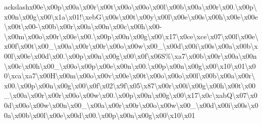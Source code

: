 ackslash{}x00e\textbackslash{}x00p\textbackslash{}x00a\textbackslash{}x00r\textbackslash{}x00t\textbackslash{}x00o\textbackslash{}x00o\textbackslash{}x00l\textbackslash{}x00b\textbackslash{}x00a\textbackslash{}x00r\textbackslash{}x00.\textbackslash{}x00p\textbackslash{}x00n\textbackslash{}x00g\textbackslash{}x00\textbackslash{}x1a\textbackslash{}x01!\textbackslash{}xeb\+G\textbackslash{}x00s\textbackslash{}x00t\textbackslash{}x00y\textbackslash{}x00l\textbackslash{}x00e\textbackslash{}x00s\textbackslash{}x00h\textbackslash{}x00e\textbackslash{}x00e\textbackslash{}x00t\textbackslash{}x00-\/\textbackslash{}x00b\textbackslash{}x00r\textbackslash{}x00a\textbackslash{}x00n\textbackslash{}x00c\textbackslash{}x00h\textbackslash{}x00-\/\textbackslash{}x00m\textbackslash{}x00o\textbackslash{}x00r\textbackslash{}x00e\textbackslash{}x00.\textbackslash{}x00p\textbackslash{}x00n\textbackslash{}x00g\textbackslash{}x00\textbackslash{}x17\textbackslash{}x0ce\textbackslash{}xce\textbackslash{}x07\textbackslash{}x00l\textbackslash{}x00e\textbackslash{}x00f\textbackslash{}x00t\textbackslash{}x00\+\_\+\textbackslash{}x00a\textbackslash{}x00r\textbackslash{}x00r\textbackslash{}x00o\textbackslash{}x00w\textbackslash{}x00\+\_\+\textbackslash{}x00d\textbackslash{}x00i\textbackslash{}x00s\textbackslash{}x00a\textbackslash{}x00b\textbackslash{}x00l\textbackslash{}x00e\textbackslash{}x00d\textbackslash{}x00.\textbackslash{}x00p\textbackslash{}x00n\textbackslash{}x00g\textbackslash{}x00\textbackslash{}x0f\textbackslash{}x06\+S\%\textbackslash{}xa7\textbackslash{}x00b\textbackslash{}x00r\textbackslash{}x00a\textbackslash{}x00n\textbackslash{}x00c\textbackslash{}x00h\textbackslash{}x00\+\_\+\textbackslash{}x00o\textbackslash{}x00p\textbackslash{}x00e\textbackslash{}x00n\textbackslash{}x00.\textbackslash{}x00p\textbackslash{}x00n\textbackslash{}x00g\textbackslash{}x00\textbackslash{}x10\textbackslash{}x01\textbackslash{}x00\textbackslash{}xca\textbackslash{}xa7\textbackslash{}x00\+H\textbackslash{}x00m\textbackslash{}x00o\textbackslash{}x00v\textbackslash{}x00e\textbackslash{}x00t\textbackslash{}x00o\textbackslash{}x00o\textbackslash{}x00l\textbackslash{}x00b\textbackslash{}x00a\textbackslash{}x00r\textbackslash{}x00.\textbackslash{}x00p\textbackslash{}x00n\textbackslash{}x00g\textbackslash{}x00\textbackslash{}x0f\textbackslash{}x02\textbackslash{}x9f\textbackslash{}x05\textbackslash{}x87\textbackslash{}x00r\textbackslash{}x00i\textbackslash{}x00g\textbackslash{}x00h\textbackslash{}x00t\textbackslash{}x00\+\_\+\textbackslash{}x00a\textbackslash{}x00r\textbackslash{}x00r\textbackslash{}x00o\textbackslash{}x00w\textbackslash{}x00.\textbackslash{}x00p\textbackslash{}x00n\textbackslash{}x00g\textbackslash{}x00\textbackslash{}x17\textbackslash{}x0c\textbackslash{}xab\+Q\textbackslash{}x07\textbackslash{}x00d\textbackslash{}x00o\textbackslash{}x00w\textbackslash{}x00n\textbackslash{}x00\+\_\+\textbackslash{}x00a\textbackslash{}x00r\textbackslash{}x00r\textbackslash{}x00o\textbackslash{}x00w\textbackslash{}x00\+\_\+\textbackslash{}x00d\textbackslash{}x00i\textbackslash{}x00s\textbackslash{}x00a\textbackslash{}x00b\textbackslash{}x00l\textbackslash{}x00e\textbackslash{}x00d\textbackslash{}x00.\textbackslash{}x00p\textbackslash{}x00n\textbackslash{}x00g\textbackslash{}x00\textbackslash{}x10\textbackslash{}x01\textb